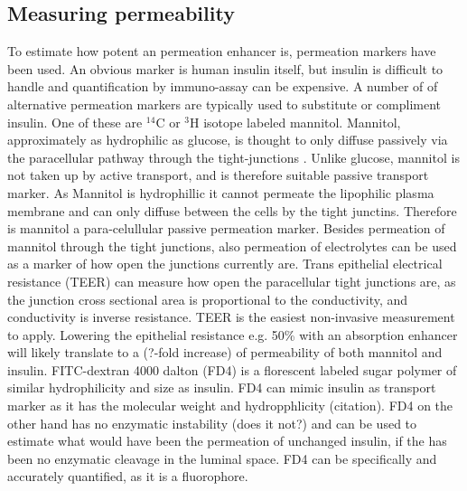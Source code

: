 \subsection{Measuring permeability}
To estimate how potent an permeation enhancer is, permeation markers have been used. An obvious marker is human insulin itself, but insulin is difficult to handle and quantification by immuno-assay can be expensive. A number of of alternative permeation markers are typically used to substitute or compliment insulin. One of these are $^{14}$C or $^3$H isotope labeled mannitol. Mannitol, approximately as hydrophilic as glucose, is thought to only diffuse passively via the paracellular pathway through the tight-junctions \cite{anderberg1992epithelial,artursson1994effect}. Unlike glucose, mannitol is not taken up by active transport, and is therefore suitable passive transport marker. As Mannitol is hydrophillic it cannot permeate the lipophilic plasma membrane and can only diffuse between the cells by the tight junctins. Therefore is mannitol a para-celullular passive permeation marker. Besides permeation of mannitol through the tight junctions, also permeation of electrolytes can be used as a marker of how open the junctions currently are. Trans epithelial electrical resistance (TEER) can measure how open the paracellular tight junctions are, as the junction cross sectional area is proportional to the conductivity, and conductivity is inverse resistance. TEER is the easiest non-invasive measurement to apply. Lowering the epithelial resistance e.g. 50\% with an absorption enhancer will likely translate to a (?-fold increase) of permeability of both mannitol and insulin. FITC-dextran 4000 dalton (FD4) is a florescent labeled sugar polymer of similar hydrophilicity and size as insulin. FD4 can mimic insulin as transport marker as it has the molecular weight and hydropphlicity (citation). FD4 on the other hand has no enzymatic instability (does it not?) and can be used to estimate what would have been the permeation of unchanged insulin, if the has been no enzymatic cleavage in the luminal space. FD4 can be specifically and accurately quantified, as it is a fluorophore.

